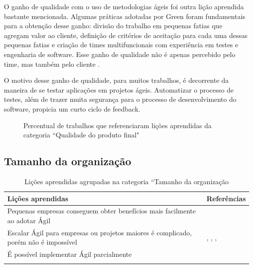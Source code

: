 O ganho de qualidade com o uso de metodologias ágeis foi outra lição aprendida bastante mencionada. Algumas práticas adotadas por Green foram fundamentais para a obtenção desse ganho: divisão do trabalho em pequenas fatias que agregam valor ao cliente, definição de critérios de aceitação para cada uma dessas pequenas fatias e criação de times multifuncionais com experiência em testes e engenharia de software. Esse ganho de qualidade não é apenas percebido pelo time, mas também pelo cliente \cite{Adobe2012}.

O motivo desse ganho de qualidade, para muitos trabalhos, é decorrente da maneira de se testar aplicações em projetos ágeis. Automatizar o processo de testes, além de trazer muita segurança para o processo de desenvolvimento do software, propicia um curto ciclo de feedback.

\begin{figure}[H]
	\centering
	\captionsetup{justification=centering}
	\caption{Percentual de trabalhos que referenciaram lições aprendidas da categoria ``Qualidade do produto final"}
	\label{fig:qualidade}
\end{figure}

\subsection{Tamanho da organização}

\begin{table}[H]
	\centering
	\captionsetup{justification=centering}
	\begin{tabularx}{\linewidth}{ | X | p{5cm} | } \hline \textbf{Lições aprendidas} & \textbf{Referências} \\ \hline
		Pequenas empresas conseguem obter benefícios mais facilmente ao adotar Ágil & \cite{Bustard2013} \\ \hline
		Escalar Ágil para empresas ou projetos maiores é complicado, porém não é impossível & \cite{Microsoft2013}, \cite{Claudia2013}, \cite{Korhonen2010}, \cite{Maciel2013} \\ \hline
		É possível implementar Ágil parcialmente & \cite{Ericsson2013} \\ \hline
	\caption{Lições aprendidas agrupadas na categoria ``Tamanho da organização}
	\end{tabularx}
\end{table}

